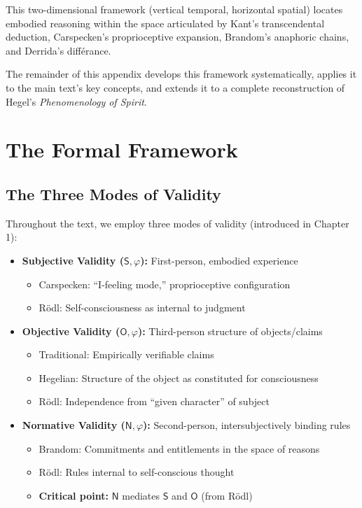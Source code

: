\documentclass[12pt]{book}
\begin{document}
This two-dimensional framework (vertical temporal, horizontal spatial) locates embodied reasoning within the space articulated by Kant's transcendental deduction, Carspecken's proprioceptive expansion, Brandom's anaphoric chains, and Derrida's différance.

The remainder of this appendix develops this framework systematically, applies it to the main text's key concepts, and extends it to a complete reconstruction of Hegel's \emph{Phenomenology of Spirit}.

\section{The Formal Framework}

\subsection{The Three Modes of Validity}

Throughout the text, we employ three modes of validity (introduced in Chapter 1):

\begin{itemize}
    \item \textbf{Subjective Validity ($\mathsf{S},\varphi$):} First-person, embodied experience
    \begin{itemize}
        \item Carspecken: ``I-feeling mode,'' proprioceptive configuration
        \item Rödl: Self-consciousness as internal to judgment
    \end{itemize}
    
    \item \textbf{Objective Validity ($\mathsf{O},\varphi$):} Third-person structure of objects/claims
    \begin{itemize}
        \item Traditional: Empirically verifiable claims
        \item Hegelian: Structure of the object as constituted for consciousness
        \item Rödl: Independence from ``given character'' of subject
    \end{itemize}
    
    \item \textbf{Normative Validity ($\mathsf{N},\varphi$):} Second-person, intersubjectively binding rules
    \begin{itemize}
        \item Brandom: Commitments and entitlements in the space of reasons
        \item Rödl: Rules internal to self-conscious thought
        \item \textbf{Critical point:} $\mathsf{N}$ mediates $\mathsf{S}$ and $\mathsf{O}$ (from Rödl)
    \end{itemize}
\end{itemize}
\end{document}
